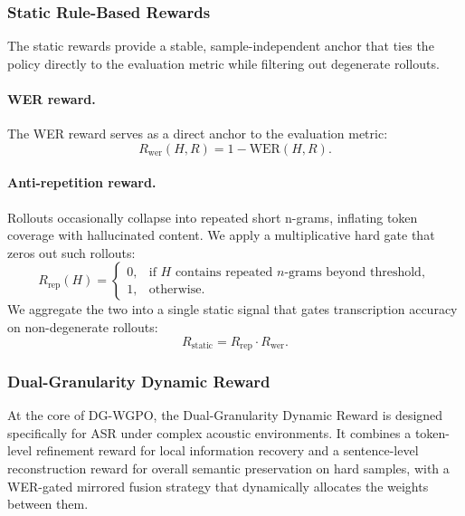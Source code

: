 \documentclass{llmxive}
\begin{document}
\subsubsection{Static Rule-Based Rewards}
\vspace{-1mm}
The static rewards provide a stable, sample-independent anchor that ties the policy directly to the evaluation metric while filtering out degenerate rollouts.
\paragraph{WER reward.} The WER reward serves as a direct anchor to the evaluation metric:
\begin{equation}
R_\text{wer}(H, R) = 1 - \text{WER}(H, R).
\end{equation}
\paragraph{Anti-repetition reward.} Rollouts occasionally collapse into repeated short n-grams, inflating token coverage with hallucinated content. We apply a multiplicative hard gate that zeros out such rollouts:
\begin{equation}
R_\text{rep}(H) = 
\begin{cases}
0, & \text{if } H \text{ contains repeated $n$-grams beyond threshold}, \\
1, & \text{otherwise}.
\end{cases}
\end{equation}
We aggregate the two into a single static signal that gates transcription accuracy on non-degenerate rollouts:
\begin{equation}
R_\text{static} = R_\text{rep} \cdot R_\text{wer}.
\end{equation}


\vspace{-1mm}
\subsubsection{Dual-Granularity Dynamic Reward}
\vspace{-1mm}
At the core of DG-WGPO, the Dual-Granularity Dynamic Reward is designed specifically for ASR under complex acoustic environments. It combines a token-level refinement reward for local information recovery and a sentence-level reconstruction reward for overall semantic preservation on hard samples, with a WER-gated mirrored fusion strategy that dynamically allocates the weights between them.
\end{document}
